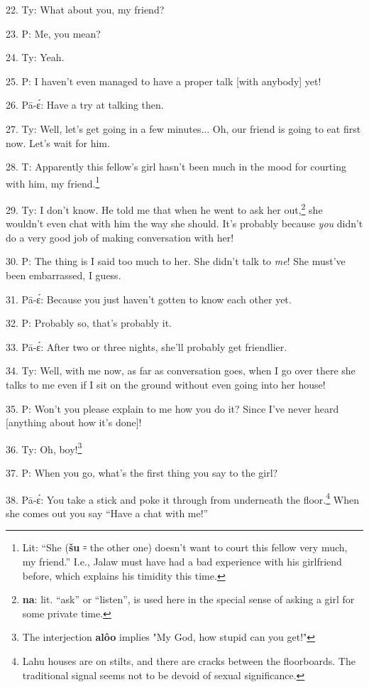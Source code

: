 22. Ty: What about you, my friend?

23. P: Me, you mean?

24. Ty: Yeah.

25. P: I haven't even managed to have a proper talk [with anybody] yet!

26. Pā-ɛ́: Have a try at talking then.

27. Ty: Well, let's get going in a few minutes... Oh, our friend is going
to eat first now. Let's wait for him.

28. T:  Apparently this fellow's girl hasn't
been much in the mood for courting with him, my friend.\footnote{Lit: ``She (\textbf{šu} ꞊ the other one) doesn't want to court this fellow very much, my friend.'' I.e., Jalaw must have had a bad experience with his girlfriend before, which explains his timidity this time.}

29. Ty: I don't know. He told me that when he went to ask her out,\footnote{\textbf{na}: lit. ``ask'' or ``listen'', is used here in the special sense of asking a girl for some private time.} she
wouldn't even chat with him the way she should. 
It's probably because \textit{you} didn't do a very good job of making conversation
with her!

30. P: The thing is I said too much to her. She didn't talk to\textit{ me}!
She must've been embarrassed, I guess.

31. Pā-ɛ́: Because you just haven't gotten to know each other yet.

32. P: Probably so, that's probably it.

33. Pā-ɛ́: After two or three nights, she'll probably get friendlier.

34. Ty: Well, with me now, as far as conversation goes, when I go over there
she talks to me even if I sit on the ground without even going into her house!

35. P: Won't you please explain to me how you do it? Since I've never heard
[anything about how it's done]!

36. Ty: Oh, boy!\footnote{The interjection \textbf{alôo} implies "My God, how stupid can you get!"}

37. P: When you go, what's the first thing you say to the girl?

38. Pā-ɛ́: You take a stick and poke it through from underneath the floor.\footnote{Lahu houses are on stilts, and there are cracks between the floorboards. The traditional signal seems not to be devoid of sexual significance.}
When she comes out you say ``Have a chat with me!''

